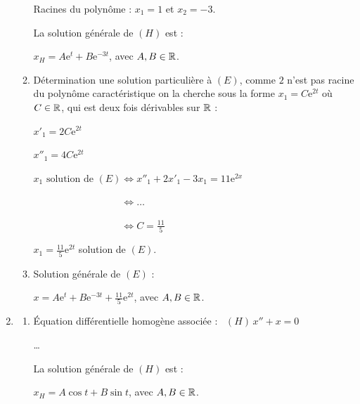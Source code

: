 \documentclass{book}
\begin{document}
\begin{Exercice}
\begin{Correction}
\begin{enumerate}
\begin{enumerate}
			Racines du polynôme : $x_1 = 1$ et $x_2 =  - 3$.

			La solution générale de $(H)$ est : 
			
			\hspace{0.7cm} $x_H = A \mathrm{e}^{t} + B  \mathrm{e}^{-3t}$, avec $A,B \in \mathbb{R}$.

		\item Détermination une solution particulière à $(E)$, comme $2$ n'est pas racine du polynôme caractéristique on la cherche sous la forme $x_1 = C \mathrm{e}^{2t}$ où $C \in \mathbb{R}$, qui est deux fois dérivables sur $\mathbb{R}$ :
		
			\hspace{0.7cm} $x'_1 = 2C \mathrm{e}^{2t}$

			\hspace{0.7cm} $x''_1 = 4C \mathrm{e}^{2t}$
			
		\hspace{0.7cm} $x_{1} \text{ solution de } (E) \Longleftrightarrow x''_{1} +2 x'_1 - 3x_{1} = 11\mathrm{e}^{2x}$

		\hspace{0.7cm} $\phantom{x_{1} \text{ solution de } (E)} \Longleftrightarrow  \dots$
		
		\hspace{0.7cm} $\phantom{x_{1} \text{ solution de } (E)} \Longleftrightarrow C=\tfrac{11}{5}$
		
		\hspace{0.7cm} $x_{1} = \tfrac{11}{5} \mathrm{e}^{2t} $ solution de $(E)$.
		
		\item Solution générale de $(E)$ :
		
		\hspace{0.7cm} $x = A \mathrm{e}^{t} + B  \mathrm{e}^{-3t} + \tfrac{11}{5} \mathrm{e}^{2t} $, avec $A,B \in \mathbb{R}$.	
	\end{enumerate}

\item %
	\begin{enumerate}
		\item  \'Equation différentielle homogène associée :  \, $ (H) \,x'' + x = 0 $

			\dots

			La solution générale de $(H)$ est : 
			
			\hspace{0.7cm} $x_H = A \cos t + B  \sin t $, avec $A,B \in \mathbb{R}$.


\end{enumerate}
\end{enumerate}
\end{Correction}
\end{Exercice}
\end{document}
